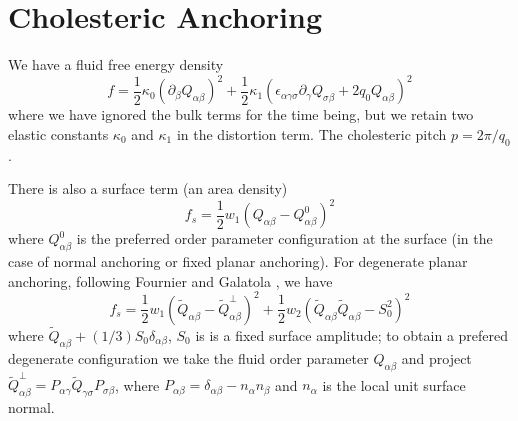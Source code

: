 %
%
%
%
%

\section{Cholesteric Anchoring}

We have a fluid free energy density
\begin{equation}
f = 
{\textstyle\frac{1}{2}} \kappa_0 (\partial_\beta Q_{\alpha\beta})^2
+ {\textstyle\frac{1}{2}}
 \kappa_1 (\epsilon_{\alpha\gamma\sigma} \partial_\gamma
Q_{\sigma\beta} + 2q_0 Q_{\alpha\beta})^2
\end{equation}
where we have ignored the bulk terms for the time being, but we retain
two elastic constants $\kappa_0$ and $\kappa_1$ in the distortion term.
The cholesteric pitch $p = 2\pi/q_0$.

There is also a surface term (an area density)
\begin{equation}
f_s = {\textstyle\frac{1}{2}} w_1 (Q_{\alpha\beta} - Q_{\alpha\beta}^0)^2
\end{equation}
where $Q^0_{\alpha\beta}$ is the preferred order parameter configuration
at the surface (in the case of normal anchoring or fixed planar anchoring).
For degenerate planar anchoring,
following Fournier and Galatola \cite{fournier2005}, we have
\begin{equation}
f_s = {\textstyle\frac{1}{2}} w_1 (\tilde{Q}_{\alpha\beta}
    - \tilde{Q}^\perp_{\alpha\beta})^2
    + {\textstyle\frac{1}{2}} w_2 (\tilde{Q}_{\alpha\beta}
                      \tilde{Q}_{\alpha\beta} - S^2_0)^2
\end{equation}
where $\tilde{Q}_{\alpha\beta} + (1/3)S_0 \delta_{\alpha\beta}$, $S_0$ is
is a fixed surface amplitude; to obtain a prefered degenerate
configuration we take the fluid order parameter $Q_{\alpha\beta}$ and
project $\tilde{Q}^\perp_{\alpha\beta} = P_{\alpha\gamma}
\tilde{Q}_{\gamma\sigma}
P_{\sigma\beta}$, where $P_{\alpha\beta} = \delta_{\alpha\beta}
- n_\alpha n_\beta$ and $n_\alpha$ is the local unit surface normal.

